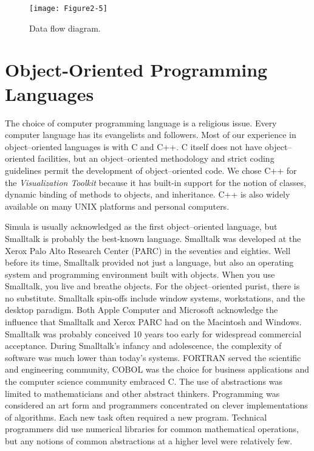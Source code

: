\begin{figure}[!htb]
	\centering
	\texttt{[image: Figure2-5]}
	\caption{Data flow diagram.}
	\label{fig:Figure2-5}
\end{figure}

\section{Object-Oriented Programming Languages}

The choice of computer programming language is a religious issue. Every computer language has its evangelists and followers. Most of our experience in object--oriented languages is with C and C++. C itself does not have object--oriented facilities, but an object--oriented methodology and strict coding guidelines permit the development of object--oriented code. We chose C++ for the \emph{Visualization Toolkit} because it has built-in support for the notion of classes, dynamic binding of methods to objects, and inheritance. C++ is also widely available on many UNIX platforms and personal computers.

Simula \cite{Birtwistle79} is usually acknowledged as the first object--oriented language, but Smalltalk \cite{Goldberg83} is probably the best-known language. Smalltalk was developed at the Xerox Palo Alto Research Center (PARC) in the seventies and eighties. Well before its time, Smalltalk provided not just a language, but also an operating system and programming environment built with objects. When you use Smalltalk, you live and breathe objects. For the object--oriented purist, there is no substitute. Smalltalk spin-offs include window systems, workstations, and the desktop paradigm. Both Apple Computer and Microsoft acknowledge the influence that Smalltalk and Xerox PARC had on the Macintosh and Windows. Smalltalk was probably conceived 10 years too early for widespread commercial acceptance. During Smalltalk's infancy and adolescence, the complexity of software was much lower than today's systems. FORTRAN served the scientific and engineering community, COBOL was the choice for business applications and the computer science community embraced C. The use of abstractions was limited to mathematicians and other abstract thinkers. Programming was considered an art form and programmers concentrated on clever implementations of algorithms. Each new task often required a new program. Technical programmers did use numerical libraries for common mathematical operations, but any notions of common abstractions at a higher level were relatively few.

